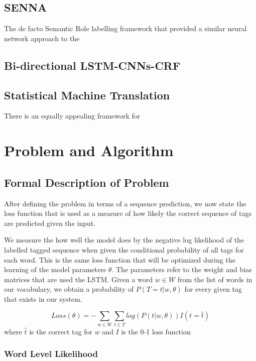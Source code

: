 \documentclass[fyp]{socreport}
\begin{document}
\section{SENNA}
The de facto Semantic Role labelling framework that provided a similar
neural network approach to the \cite{DBLP2011Collobert}

\section{Bi-directional LSTM-CNNs-CRF}


\section{Statistical Machine Translation}
There is an equally appealing framework for


\label{ch:related}


\chapter{Problem and Algorithm}
\section{Formal Description of Problem}
After defining the problem in terms of a sequence prediction, we now state the
loss function that is used as a measure of how likely the correct sequence of
tags are predicted given the input.

We measure the how well the model does by the negative log likelihood
of the labelled tagged sequence when given the conditional probability of all
tags for each word. This is the same loss function that will be optimized during
the learning of the model parameters $\theta$. The parameters refer to the
weight and bias matrices that are used the LSTM. Given a word $w \in W$ from
the list of words in our vocabulary, we obtain a probability of $P(T=t | w,
\theta)$ for every given tag that exists in our system.

\begin{equation}
  Loss(\theta) = -\sum_{w \in W} \sum_{t \in T} log(P(t | w, \theta)) I(t = \hat{t})
\end{equation}
where $\hat{t}$ is the correct tag for $w$ and $I$ is the 0-1 loss function

\subsection{Word Level Likelihood}
\end{document}
